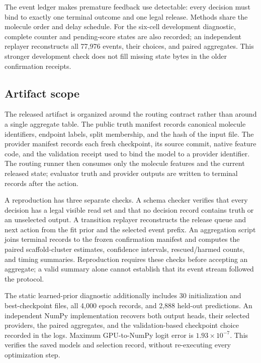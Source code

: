 \documentclass[sigconf,anonymous]{aamas}
\begin{document}
The event ledger makes premature feedback use detectable: every decision must bind to exactly one terminal outcome and one legal release. Methods share the molecule order and delay schedule. For the six-cell development diagnostic, complete counter and pending-score states are also recorded; an independent replayer reconstructs all 77,976 events, their choices, and paired aggregates. This stronger development check does not fill missing state bytes in the older confirmation receipts.



\subsection{Artifact scope}
The released artifact is organized around the routing contract rather than around a single aggregate table. The public truth manifest records canonical molecule identifiers, endpoint labels, split membership, and the hash of the input file. The provider manifest records each fresh checkpoint, its source commit, native feature code, and the validation receipt used to bind the model to a provider identifier. The routing runner then consumes only the molecule features and the current released state; evaluator truth and provider outputs are written to terminal records after the action.



A reproduction has three separate checks. A schema checker verifies that every decision has a legal visible read set and that no decision record contains truth or an unselected output. A transition replayer reconstructs the release queue and next action from the fit prior and the selected event prefix. An aggregation script joins terminal records to the frozen confirmation manifest and computes the paired scaffold-cluster estimates, confidence intervals, rescued/harmed counts, and timing summaries. Reproduction requires these checks before accepting an aggregate; a valid summary alone cannot establish that its event stream followed the protocol.

The static learned-prior diagnostic additionally includes 30 initialization and best-checkpoint files, all 4,000 epoch records, and 2,888 held-out predictions. An independent NumPy implementation recovers both output heads, their selected providers, the paired aggregates, and the validation-based checkpoint choice recorded in the logs. Maximum GPU-to-NumPy logit error is $1.93\times10^{-7}$. This verifies the saved models and selection record, without re-executing every optimization step.
\end{document}
